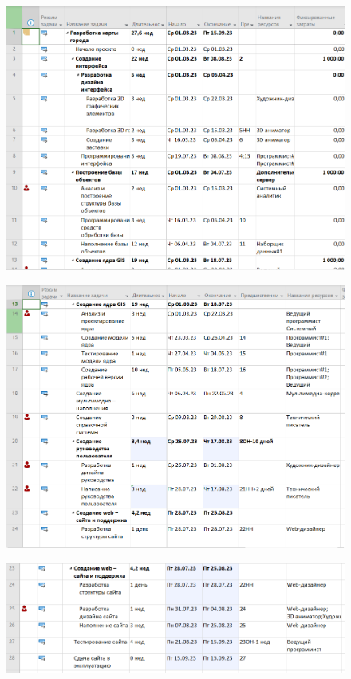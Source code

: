 \begin{figure}[H]
	\begin{center}
		\includegraphics[width=\textwidth]{imgs/task_1_3.png}
	\end{center}
\end{figure}

\begin{figure}[H]
	\begin{center}
		\includegraphics[width=\textwidth]{imgs/task_1_4.png}
	\end{center}
\end{figure}

\begin{figure}[H]
	\begin{center}
		\includegraphics[width=\textwidth]{imgs/task_1_5.png}
	\end{center}
\end{figure}

